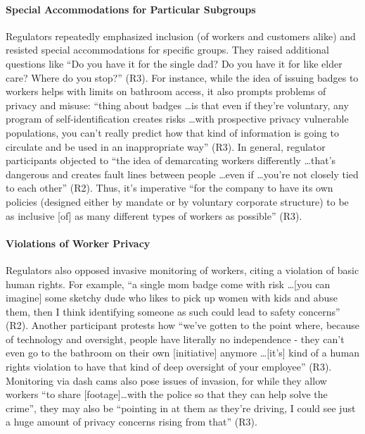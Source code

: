 \paragraph{Special Accommodations for Particular Subgroups}
Regulators repeatedly emphasized inclusion (of workers and customers alike) and resisted special accommodations for specific groups. They raised additional questions like ``Do you have it for the single dad? Do you have it for like elder care? Where do you stop?'' (R3). 
For instance, while the idea of issuing badges to workers helps with limits on bathroom access, it also prompts problems of privacy and misuse: ``thing about badges \dots is that even if they're voluntary, any program of self-identification creates risks \dots with prospective privacy vulnerable populations, you can't really predict how that kind of information is going to circulate and be used in an inappropriate way'' (R3). 
In general, regulator participants objected to ``the idea of demarcating workers differently \dots that's dangerous and creates fault lines between people \dots even if \dots you're not closely tied to each other'' (R2). Thus, it's imperative ``for the company to have its own policies (designed either by mandate or by voluntary corporate structure) to be as inclusive [of] as many different types of workers as possible'' (R3). 

\paragraph{Violations of Worker Privacy}
Regulators also opposed invasive monitoring of workers, citing a violation of basic human rights. 
For example, ``a single mom badge come with risk \dots [you can imagine] some sketchy dude who likes to pick up women with kids and abuse them, then I think identifying someone as such could lead to safety concerns'' (R2). 
Another participant protests how ``we've gotten to the point where, because of technology and oversight, people have literally no independence - they can't even go to the bathroom on their own [initiative] anymore \dots [it's] kind of a human rights violation to have that kind of deep oversight of your employee'' (R3).
Monitoring via dash cams also pose issues of invasion, for while they allow workers ``to share [footage]\dots with the police so that they can help solve the crime'', they may also be ``pointing in at them as they're driving, I could see just a huge amount of privacy concerns rising from that'' (R3). 


